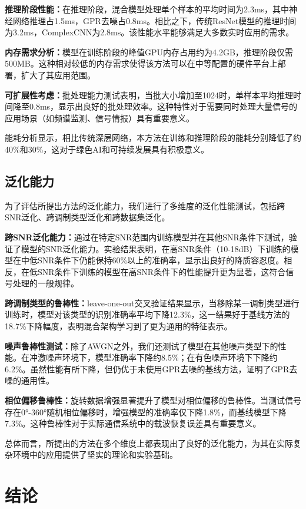\documentclass[conference]{IEEEtran}
\begin{document}
\textbf{推理阶段性能：}在推理阶段，混合模型处理单个样本的平均时间为2.3ms，其中神经网络推理占1.5ms，GPR去噪占0.8ms。相比之下，传统ResNet模型的推理时间为3.2ms，ComplexCNN为2.8ms。该性能水平能够满足大多数实时应用的需求。

\textbf{内存需求分析：}模型在训练阶段的峰值GPU内存占用约为4.2GB，推理阶段仅需500MB。这种相对较低的内存需求使得该方法可以在中等配置的硬件平台上部署，扩大了其应用范围。

\textbf{可扩展性考虑：}批处理能力测试表明，当批大小增加至1024时，单样本平均推理时间降至0.8ms，显示出良好的批处理效率。这种特性对于需要同时处理大量信号的应用场景（如频谱监测、信号情报）具有重要意义。

能耗分析显示，相比传统深层网络，本方法在训练和推理阶段的能耗分别降低了约40\%和30\%，这对于绿色AI和可持续发展具有积极意义。

\subsection{泛化能力}

为了评估所提出方法的泛化能力，我们进行了多维度的泛化性能测试，包括跨SNR泛化、跨调制类型泛化和跨数据集泛化。

\textbf{跨SNR泛化能力：}通过在特定SNR范围内训练模型并在其他SNR条件下测试，验证了模型的SNR泛化能力。实验结果表明，在高SNR条件（10-18dB）下训练的模型在中低SNR条件下仍能保持60\%以上的准确率，显示出良好的降质容忍度。相反，在低SNR条件下训练的模型在高SNR条件下的性能提升更为显著，这符合信号处理的一般规律。

\textbf{跨调制类型的鲁棒性：}leave-one-out交叉验证结果显示，当移除某一调制类型进行训练时，模型对该类型的识别准确率平均下降12.3\%，这一结果好于基线方法的18.7\%下降幅度，表明混合架构学习到了更为通用的特征表示。

\textbf{噪声鲁棒性测试：}除了AWGN之外，我们还测试了模型在其他噪声类型下的性能。在冲激噪声环境下，模型准确率下降约8.5\%；在有色噪声环境下下降约6.2\%。虽然性能有所下降，但仍优于未使用GPR去噪的基线方法，证明了GPR去噪的通用性。

\textbf{相位偏移鲁棒性：}旋转数据增强显著提升了模型对相位偏移的鲁棒性。当测试信号存在0°-360°随机相位偏移时，增强模型的准确率仅下降1.8\%，而基线模型下降7.3\%。这种鲁棒性对于实际通信系统中的载波恢复误差具有重要意义。

总体而言，所提出的方法在多个维度上都表现出了良好的泛化能力，为其在实际复杂环境中的应用提供了坚实的理论和实验基础。

\section{结论}
\end{document}
